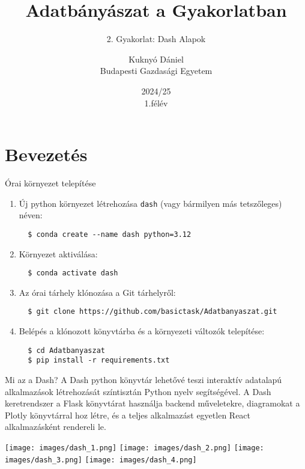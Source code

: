 \documentclass[english, aspectratio=169]{beamer}
\makeatletter
\newcommand\makebeamertitle{\frame{\maketitle}}
\let\origtableofcontents=\tableofcontents
\def\tableofcontents{\@ifnextchar[{\origtableofcontents}{\gobbletableofcontents}}
\def\gobbletableofcontents#1{\origtableofcontents}
\makeatother
\begin{document}
\section{Bevezetés}
\title[]{Adatbányászat a Gyakorlatban}
\subtitle{2. Gyakorlat: Dash Alapok}
\author[Kuknyó Dániel]{Kuknyó Dániel\\Budapesti Gazdasági Egyetem}
\date{2024/25\\1.félév}
\makebeamertitle

\begin{frame}
\tableofcontents{}
\end{frame}

\begin{frame}
\tableofcontents[currentsection]
\end{frame}

\begin{frame}[fragile]{Órai környezet telepítése}
\begin{enumerate}
  \item Új python környezet létrehozása \texttt{dash} (vagy bármilyen más tetszőleges) néven:
  \begin{lstlisting}
  $ conda create --name dash python=3.12
  \end{lstlisting}
  \item Környezet aktiválása:
  \begin{lstlisting}
  $ conda activate dash
  \end{lstlisting}
  \item Az órai tárhely klónozása a Git tárhelyről:
  \begin{lstlisting}
  $ git clone https://github.com/basictask/Adatbanyaszat.git
  \end{lstlisting}
  \item Belépés a klónozott könyvtárba és a környezeti változók telepítése:
  \begin{lstlisting}
  $ cd Adatbanyaszat
  $ pip install -r requirements.txt
  \end{lstlisting}
\end{enumerate}
\end{frame}

\begin{frame}[fragile]{Mi az a Dash?}
A Dash python könyvtár lehetővé teszi interaktív adatalapú alkalmazások létrehozását színtisztán Python nyelv segítségével. A Dash keretrendszer a Flask könyvtárat használja backend műveletekre, diagramokat a Plotly könyvtárral hoz létre, és a teljes alkalmazást egyetlen React alkalmazásként rendereli le.
\begin{center}
\texttt{[image: images/dash\_1.png]}
\texttt{[image: images/dash\_2.png]}
\texttt{[image: images/dash\_3.png]}
\texttt{[image: images/dash\_4.png]}
\end{center}
\end{frame}
\end{document}

